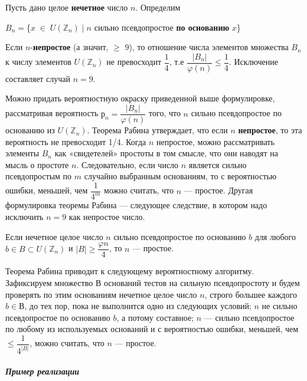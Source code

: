 \documentclass{mai_book}
\begin{document}
  	\begin{thm}[Рабин]
  	\noindent
  	
  	Пусть дано целое {\bf нечетное} число $n$. Определим
  	\begin{center}
  		$B_n = $\{$x\;\in\;U(\mathbb Z_n)\;|\;n$ сильно псевдопростое {\bf по основанию} $x$\} 
  	\end{center}
  	Если $n$-{\bf непростое} (а значит, $\geqslant$ 9), то отношение числа элементов множества $B_n$
  	к числу элементов $U(\mathbb Z_n)$ не превосходит $\dfrac{1}{4}$, т.е $\dfrac{|B_n|}{\varphi(n)} \leqslant \dfrac{1}{4}$. Исключение составляет случай $n = 9$.
  	\end{thm}
  	Можно придать вероятностную окраску приведенной выше формулировке, рассматривая вероятность $р_n = \dfrac{|B_n|}{\varphi(n)}$ того, что $n$ сильно псевдопростое по основанию из $U(\mathbb Z_n)$. Теорема Рабина утверждает, что 	если $n$ {\bf непростое}, то эта вероятность не превосходит 1/4. Когда $n$  	непростое, можно рассматривать элементы $B_n$	как «свидетелей» простоты в том смысле, что они наводят на мысль о простоте $n$. Следовательно, если число $n$ является сильно псевдопростым по $m$ случайно 	выбранным основаниям, то с вероятностью ошибки, меньшей, чем $\dfrac{1}{4^m}$ можно считать, что $n$ — простое. Другая формулировка теоремы Рабина — следующее следствие, в котором надо исключить $n = 9$ как непростое число.

  	
  	\begin{sled}
  	\noindent
  	
  	Если нечетное целое число $n$ сильно псевдопростое по основанию $b$	для любого $b \in B\subset U(\mathbb Z_n)$ и $|B| \geqslant \dfrac{\varphi{n}}{4}$, то $n$  — простое.
  	\end{sled}
  	Теорема Рабина приводит к следующему вероятностному алгорит­му. Зафиксируем множество $В$ оснований тестов на сильную псевдопростоту и будем проверять по этим основаниям нечетное целое число $n$, строго большее каждого $b \in В$, до тех пор, пока не выполнится одно из следующих условий; $n$ не сильно псевдопростое по основанию $b$, а  	потому составное; $n$ — сильно псевдопростое по любому из используе­мых оснований и с вероятностью ошибки, меньшей, чем $\leqslant\dfrac{1}{4^{|B|}}$, можно считать, что $n$ — простое.

  	
  	\paragraph{{\it Пример реализации}}
  	\noindent
  	
\end{document}
